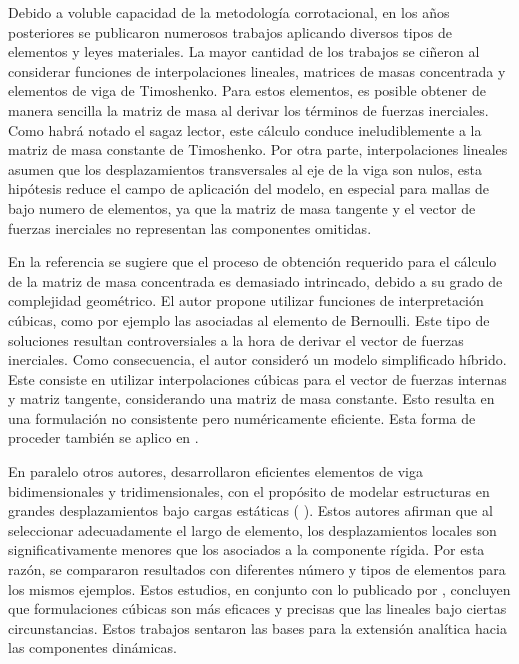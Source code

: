 Debido a voluble capacidad de la metodología corrotacional, en los años posteriores se publicaron numerosos trabajos aplicando diversos tipos de elementos y leyes materiales. La mayor cantidad de los trabajos se ciñeron al considerar funciones de interpolaciones lineales, matrices de masas concentrada y  elementos de viga de Timoshenko. Para estos elementos, es posible obtener de manera sencilla la matriz de masa al derivar los términos de fuerzas inerciales. Como habrá notado el sagaz lector, este cálculo conduce ineludiblemente a la matriz de masa constante de Timoshenko. 
Por otra parte, interpolaciones lineales asumen que los desplazamientos transversales al eje de la viga son nulos, esta hipótesis reduce el campo de aplicación del modelo, en especial para mallas de bajo numero de elementos, ya que la matriz de masa tangente y el vector de fuerzas inerciales no representan las componentes omitidas. 

En la referencia \cite{Crisfield} se sugiere que el proceso de obtención requerido para el cálculo de la matriz de masa concentrada es demasiado intrincado, debido a su grado de complejidad geométrico. El autor propone utilizar funciones de interpretación cúbicas, como por ejemplo las asociadas al elemento de Bernoulli. Este tipo de soluciones resultan controversiales a la hora de derivar el vector de fuerzas inerciales. Como consecuencia, el autor consideró un modelo simplificado híbrido. Este consiste en utilizar interpolaciones cúbicas para el vector de fuerzas internas y matriz tangente, considerando una matriz de masa constante. Esto resulta en una formulación no consistente pero numéricamente eficiente.  Esta forma de proceder también se aplico en \cite{pacoste1997beam}.

En paralelo otros autores, desarrollaron eficientes elementos de viga bidimensionales y tridimensionales, con el propósito de modelar estructuras en grandes desplazamientos bajo cargas estáticas (\cite{Battini2002} \cite{alsafadie2010corotational}).
Estos autores afirman que al seleccionar adecuadamente el largo de elemento, los desplazamientos locales son significativamente menores que los asociados a la componente rígida. Por esta razón, se compararon resultados con diferentes número y tipos de elementos para los mismos ejemplos. Estos estudios, en conjunto con lo publicado por \cite{alsafadie2010corotational}, concluyen que formulaciones cúbicas son más eficaces y precisas que las lineales bajo ciertas circunstancias. Estos trabajos sentaron las bases para la extensión analítica hacia las componentes dinámicas.

